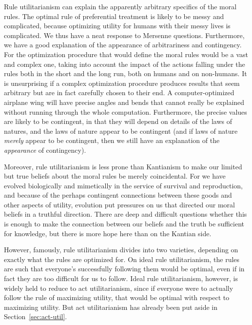 Rule utilitarianism can explain the apparently arbitrary specifics of the moral rules. The optimal rule of preferential
treatment is likely to be messy and complicated, because optimizing utility for humans with their messy lives is
complicated. We thus have a neat response to Mersenne questions. Furthermore, we have a good explanation of the
appearance of arbitrariness and contingency. For the optimization procedure that would define the moral rules would be a vast
and complex one, taking into account the impact of the actions falling under the rules both in the short and the long run, 
both on humans and on non-humans. It is unsurprising if a complex optimization procedure produces results that seem
arbitrary but are in fact carefully chosen to their end. A computer-optimized airplane wing will have precise angles and
bends that cannot really be explained without running through the whole computation. Furthermore, the precise values
are likely to be contingent, in that they will depend on details of the laws of natures, and the laws of nature appear
to be contingent (and if laws of nature \textit{merely} appear to be contingent, then we still have an explanation of 
the \textit{appearance} of contingency).

Moreover, rule utilitarianism is less prone than Kantianism to make our limited but true beliefs about the moral rules be 
merely coincidental. For we have evolved biologically and mimetically in the service of survival and reproduction, and 
because of the perhaps contingent connections between these goods and other aspects of utility, evolution put pressures on us 
that directed our moral beliefs in a truthful direction. There are deep and difficult questions whether this is enough
to make the connection between our beliefs and the truth be sufficient for knowledge, but there is more hope here
than on the Kantian side.

However, famously, rule utilitarianism divides into two varieties, depending on exactly what the rules are optimized for.
On ideal rule utilitarianism, the rules are such that everyone's successfully following them would be optimal, even if in
fact they are too difficult for us to follow. Ideal rule utilitarianism, however, is widely held to reduce to act
utilitarianism, since if everyone were to actually follow the rule of maximizing utility, that would be optimal
with respect to maximizing utility. But act utilitarianism has already been put aside in Section~\ref{sec:act-util}.

